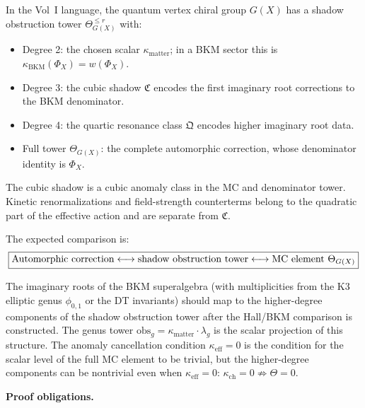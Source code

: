 \documentclass[11pt]{article}
\theoremstyle{definition}
\theoremstyle{remark}
\begin{document}
In the Vol~I language, the quantum vertex chiral group $G(X)$ has a
shadow obstruction tower
$\Theta_{G(X)}^{\leq r}$ with:
\begin{itemize}
\item Degree 2: the chosen scalar $\kappa_{\mathrm{matter}}$; in a BKM
 sector this is $\kappa_{\mathrm{BKM}}(\Phi_X)=w(\Phi_X)$.
\item Degree 3: the cubic shadow $\mathfrak{C}$ encodes the first
 imaginary root corrections to the BKM denominator.
\item Degree 4: the quartic resonance class $\mathfrak{Q}$ encodes
 higher imaginary root data.
\item Full tower $\Theta_{G(X)}$: the complete automorphic correction,
 whose denominator identity is $\Phi_X$.
\end{itemize}

The cubic shadow is a cubic anomaly class in the MC and denominator
tower. Kinetic renormalizations and field-strength counterterms belong
to the quadratic part of the effective action and are separate from
$\mathfrak{C}$.

The expected comparison is:
\[
 \boxed{%
 \text{Automorphic correction}
 \longleftrightarrow \text{shadow obstruction tower}
 \longleftrightarrow \text{MC element } \Theta_{G(X)}
 }
\]

The imaginary roots of the BKM superalgebra (with multiplicities from
the K3 elliptic genus $\phi_{0,1}$ or the DT invariants) should map to
the higher-degree components of the shadow obstruction tower after the
Hall/BKM comparison is constructed. The genus tower
$\mathrm{obs}_g = \kappa_{\mathrm{matter}} \cdot \lambda_g$ is the scalar
projection of this structure. The anomaly cancellation condition
$\kappa_{\mathrm{eff}} = 0$ is the condition for the scalar level of
the full MC element to be trivial, but the higher-degree components
can be nontrivial even when $\kappa_{\mathrm{eff}} = 0$:
$\kappa_{\mathrm{ch}} = 0 \not\Rightarrow \Theta = 0$.

\bigskip

\noindent\textbf{Proof obligations.}
\end{document}
